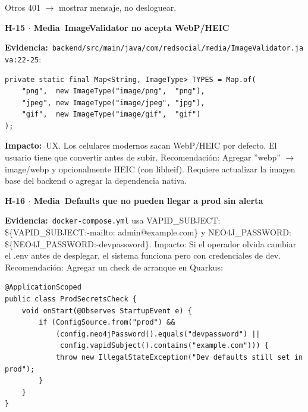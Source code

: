 \documentclass[10pt,a4paper]{article}
\newcommand{\code}[1]{\nolinkurl{#1}}
\newcommand{\badgeMedia}{\colorbox{yellow!35}{\textcolor{brown!90!black}{\textbf{\footnotesize Media}}}}
\begin{document}
Otros 401 $\rightarrow$ mostrar mensaje, no desloguear.\par\vspace{0.4em}
\vspace{0.8em}\noindent\textbf{\large H-15 $\cdot$ \badgeMedia\  ImageValidator no acepta WebP/HEIC}\par\vspace{0.3em}
\noindent\textbf{Evidencia:}\ \code{backend/src/main/java/com/redsocial/media/ImageValidator.java:22-25}:\par\vspace{0.4em}
\begin{tcolorbox}[colback=codebg,colframe=gray!40,arc=1mm]\small
\begin{verbatim}
private static final Map<String, ImageType> TYPES = Map.of(
    "png",  new ImageType("image/png",  "png"),
    "jpeg", new ImageType("image/jpeg", "jpg"),
    "gif",  new ImageType("image/gif",  "gif")
);
\end{verbatim}
\end{tcolorbox}\vspace{0.4em}
\noindent\textbf{Impacto:}\ UX. Los celulares modernos sacan WebP/HEIC por defecto. El usuario tiene que convertir antes de subir.  Recomendación: Agregar ''webp'' $\rightarrow$ image/webp y opcionalmente HEIC (con libheif). Requiere actualizar la imagen base del backend o agregar la dependencia nativa.\par\vspace{0.4em}
\vspace{0.8em}\noindent\textbf{\large H-16 $\cdot$ \badgeMedia\  Defaults que no pueden llegar a prod sin alerta}\par\vspace{0.3em}
\noindent\textbf{Evidencia:}\ \code{docker-compose.yml} usa VAPID\_SUBJECT: \$\{VAPID\_SUBJECT:-mailto: admin@example.com\} y NEO4J\_PASSWORD: \$\{NEO4J\_PASSWORD:-devpassword\}.  Impacto: Si el operador olvida cambiar el .env antes de desplegar, el sistema funciona pero con credenciales de dev.  Recomendación: Agregar un check de arranque en Quarkus:\par\vspace{0.4em}
\begin{tcolorbox}[colback=codebg,colframe=gray!40,arc=1mm]\small
\begin{verbatim}
@ApplicationScoped
public class ProdSecretsCheck {
    void onStart(@Observes StartupEvent e) {
        if (ConfigSource.from("prod") &&
            (config.neo4jPassword().equals("devpassword") ||
             config.vapidSubject().contains("example.com"))) {
            throw new IllegalStateException("Dev defaults still set in prod");
        }
    }
}
\end{verbatim}
\end{tcolorbox}\vspace{0.4em}
\end{document}
